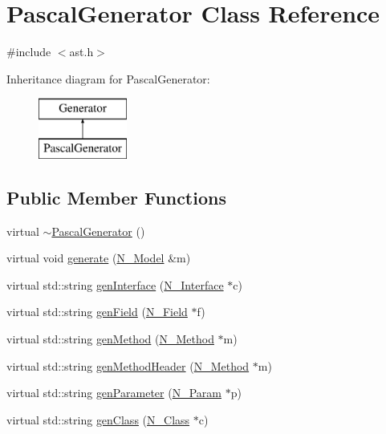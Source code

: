 \hypertarget{classPascalGenerator}{}\section{Pascal\+Generator Class Reference}
\label{classPascalGenerator}


{\ttfamily \#include $<$ast.\+h$>$}

Inheritance diagram for Pascal\+Generator\+:\begin{figure}[H]
\begin{center}
\leavevmode
\includegraphics[height=2.000000cm]{classPascalGenerator}
\end{center}
\end{figure}
\subsection*{Public Member Functions}
\begin{DoxyCompactItemize}
\item 
virtual \hyperlink{classPascalGenerator_a24880843b5375abcf1a98178336ead78}{$\sim$\+Pascal\+Generator} ()
\item 
virtual void \hyperlink{classPascalGenerator_af0d2d3b1fbf63c8c4859b446541337c5}{generate} (\hyperlink{classN__Model}{N\+\_\+\+Model} \&m)
\item 
virtual std\+::string \hyperlink{classPascalGenerator_a45d98b0d7ee0cba9708bbce1cc6e81a8}{gen\+Interface} (\hyperlink{classN__Interface}{N\+\_\+\+Interface} $\ast$c)
\item 
virtual std\+::string \hyperlink{classPascalGenerator_a2518deea7c307b53d2f5569653772df4}{gen\+Field} (\hyperlink{classN__Field}{N\+\_\+\+Field} $\ast$f)
\item 
virtual std\+::string \hyperlink{classPascalGenerator_a676b9e2ca462c770d6eab2cd9150d078}{gen\+Method} (\hyperlink{classN__Method}{N\+\_\+\+Method} $\ast$m)
\item 
virtual std\+::string \hyperlink{classPascalGenerator_a588bf9c593871ccf52f5ab66d2b25258}{gen\+Method\+Header} (\hyperlink{classN__Method}{N\+\_\+\+Method} $\ast$m)
\item 
virtual std\+::string \hyperlink{classPascalGenerator_a4498120ec4549002fb575316f1f58257}{gen\+Parameter} (\hyperlink{classN__Param}{N\+\_\+\+Param} $\ast$p)
\item 
virtual std\+::string \hyperlink{classPascalGenerator_ae8bf162efb54e857c9a61bf9aae5f6e4}{gen\+Class} (\hyperlink{classN__Class}{N\+\_\+\+Class} $\ast$c)
\end{DoxyCompactItemize}
